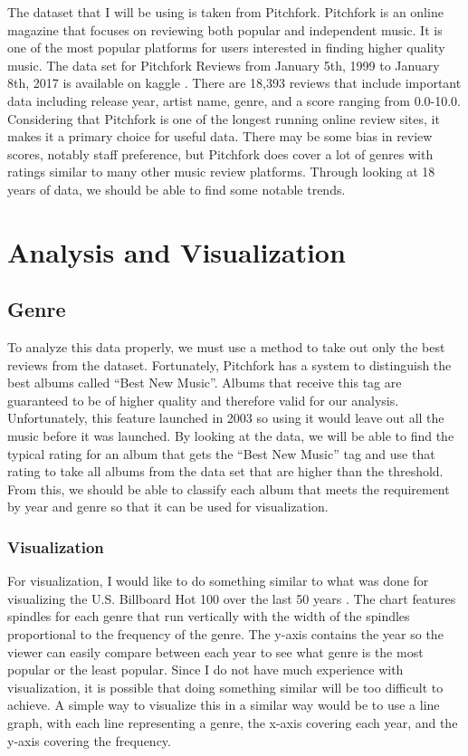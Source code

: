 \documentclass{article}
\begin{document}
The dataset that I will be using is taken from Pitchfork. Pitchfork is
an online magazine that focuses on reviewing both popular and
independent music. It is one of the most popular platforms for users
interested in finding higher quality music. The data set for Pitchfork
Reviews from January 5th, 1999 to January 8th, 2017 is available on
kaggle \citep{kaggle}. There are 18,393 reviews that include important
data including release year, artist name, genre, and a score ranging
from 0.0-10.0. Considering that Pitchfork is one of the longest running
online review sites, it makes it a primary choice for useful data. There
may be some bias in review scores, notably staff preference, but
Pitchfork does cover a lot of genres with ratings similar to many other
music review platforms. Through looking at 18 years of data, we should
be able to find some notable trends.

\section{Analysis and Visualization}\label{analysis-and-visualization}

\subsection{Genre}\label{genre}

To analyze this data properly, we must use a method to take out only the
best reviews from the dataset. Fortunately, Pitchfork has a system to
distinguish the best albums called ``Best New Music''. Albums that
receive this tag are guaranteed to be of higher quality and therefore
valid for our analysis. Unfortunately, this feature launched in 2003 so
using it would leave out all the music before it was launched. By
looking at the data, we will be able to find the typical rating for an
album that gets the ``Best New Music'' tag and use that rating to take
all albums from the data set that are higher than the threshold. From
this, we should be able to classify each album that meets the
requirement by year and genre so that it can be used for visualization.

\subsubsection{Visualization}\label{visualization}

For visualization, I would like to do something similar to what was done
for visualizing the U.S. Billboard Hot 100 over the last 50 years
\citep{BillboardFigure}. The chart features spindles for each genre that
run vertically with the width of the spindles proportional to the
frequency of the genre. The y-axis contains the year so the viewer can
easily compare between each year to see what genre is the most popular
or the least popular. Since I do not have much experience with
visualization, it is possible that doing something similar will be too
difficult to achieve. A simple way to visualize this in a similar way
would be to use a line graph, with each line representing a genre, the
x-axis covering each year, and the y-axis covering the frequency.
\end{document}
